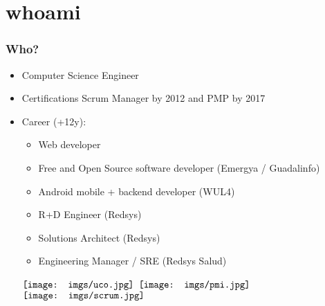 \section{whoami}
\frame
{
\frametitle{Who?}
\begin{itemize}
\item Computer Science Engineer
\item Certifications Scrum Manager by 2012 and PMP by 2017
\item Career (+12y):
	\begin{itemize}
		\item Web developer
		\item Free and Open Source software developer (Emergya / Guadalinfo)
		\item Android mobile + backend developer (WUL4)
		\item R+D Engineer (Redsys)
		\item Solutions Architect (Redsys)
		\item Engineering Manager / SRE (Redsys Salud)
	\end{itemize}
\begin{center}
  $\vcenter{\hbox{\texttt{[image: imgs/uco.jpg]}}}$
  $\vcenter{\hbox{\texttt{[image: imgs/pmi.jpg]}}}$
  $\vcenter{\hbox{\texttt{[image: imgs/scrum.jpg]}}}$
\end{center}
\end{itemize}
}
